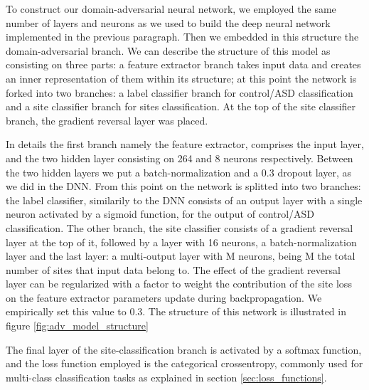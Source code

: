 \documentclass[11pt]{report}
\begin{document}

To construct our domain-adversarial neural network, we employed the same number of layers and neurons as we used to build the deep neural network implemented in the previous paragraph.
Then we embedded in this structure the domain-adversarial branch.
We can describe the structure of this model as consisting on three parts: a feature extractor branch takes input data and creates an inner representation of them within its structure; at this point the network is forked into two branches: a label classifier branch for control/ASD classification and a site classifier branch for sites classification.
At the top of the site classifier branch, the gradient reversal layer was placed.

In details the first branch namely the feature extractor, comprises the input layer, and the two hidden layer consisting on 264 and 8 neurons respectively.
Between the two hidden layers we put a batch-normalization and a 0.3 dropout layer, as we did in the DNN.
From this point on the network is splitted into two branches: the label classifier, similarily to the DNN consists of an output layer with a single neuron activated by a sigmoid function, for the output of control/ASD classification.
The other branch, the site classifier consists of a gradient reversal layer at the top of it, followed by a layer with 16 neurons, a batch-normalization layer and the last layer: a multi-output layer with M neurons, being M the total number of sites that input data belong to.
The effect of the gradient reversal layer can be regularized with a factor to weight the contribution of the site loss on the feature extractor parameters update during backpropagation.
We empirically set this value to 0.3.
The structure of this network is illustrated in figure \ref{fig:adv_model_structure}

The final layer of the site-classification branch is activated by a softmax function, and the loss function employed is the categorical crossentropy, commonly used for multi-class classification tasks as explained in section \ref{sec:loss_functions}.
\end{document}
